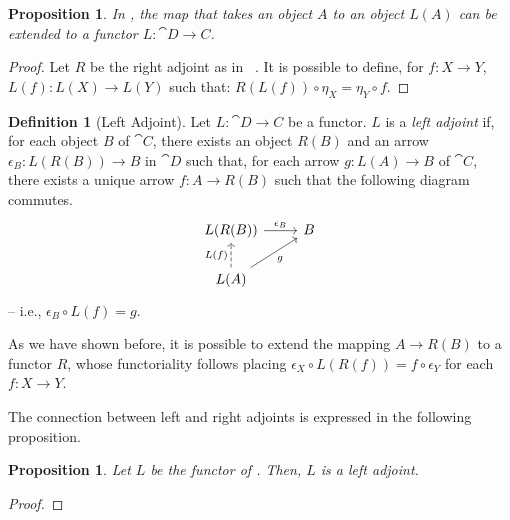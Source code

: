 \documentclass[a4paper, twoside,openright]{report}
\theoremstyle{plain}
\newtheorem{prop}[theorem]{Proposition}
\theoremstyle{definition}
\newtheorem{definition}[theorem]{Definition}
\begin{document}
\begin{prop}\label{prop:ext_left_to_funct}
    In , the map that takes an object $A$ to an object $L(A)$ can be extended to a functor $L: \cat{D \rightarrow C}$.
\end{prop}

\begin{proof}
    Let $R$ be the right adjoint as in ~. It is possible to define, for $f: X \rightarrow Y$, $L(f) : L(X) \rightarrow L(Y)$ such that: $R(L(f)) \circ \eta_X = \eta_Y \circ f$.
\end{proof}

\begin{definition}[Left Adjoint]\label{def:left_adjoint}
    Let $L: \cat{D \rightarrow C}$ be a functor. $L$ is a \emph{left adjoint} if, for each object $B$ of $\cat C$, there exists an object $R(B)$ and an arrow $\epsilon_B : L(R(B)) \rightarrow B$ in $\cat D$ such that, for each arrow $g: L(A) \rightarrow B$ of $\cat C$, there exists a unique arrow $f:A \rightarrow R(B)$ such that the following diagram commutes.
    \[
        \begin{tikzcd}
            L(R(B)) \arrow[r, "{\epsilon_B}"] & B \\
            L(A) \arrow[u, dashed, "L(f)"] \arrow[ur, "g"swap]
        \end{tikzcd}
    \]
    -- i.e., $\epsilon_B \circ L(f) = g$.
\end{definition}

As we have shown before, it is possible to extend the mapping $A \rightarrow R(B)$ to a functor $R$, whose functoriality follows placing $\epsilon_X \circ L(R(f)) = f \circ \epsilon_Y$ for each $f: X \rightarrow Y$.

The connection between left and right adjoints is expressed in the following proposition.

\begin{prop}
    Let $L$ be the functor of . Then, $L$ is a left adjoint.
\end{prop}

\begin{proof}
    
\end{proof}

\end{document}
